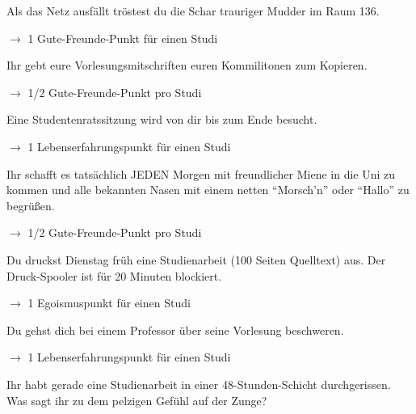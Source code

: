\documentclass[a4paper,12pt]{article}
\begin{document}
    Als das Netz ausf\"allt tr\"ostest du die Schar trauriger
    Mudder im Raum 136.

    $\rightarrow$ 1 Gute-Freunde-Punkt f\"ur einen Studi
    \vspace{10mm}



    Ihr gebt eure Vorlesungsmitschriften euren Kommilitonen
    zum Kopieren.

    $\rightarrow$ 1/2 Gute-Freunde-Punkt pro Studi
    \vspace{10mm}



    Eine Studentenratssitzung wird von dir bis zum Ende besucht.

    $\rightarrow$ 1 Lebenserfahrungspunkt f\"ur einen Studi
    \vspace{10mm}



    Ihr schafft es tats\"achlich JEDEN Morgen mit freundlicher Miene
    in die Uni zu kommen und alle bekannten Nasen mit einem netten
    ``Morsch'n'' oder ``Hallo'' zu begr\"u{\ss}en.

    $\rightarrow$ 1/2 Gute-Freunde-Punkt pro Studi
    \vspace{10mm}



    Du druckst Dienstag fr\"uh eine Studienarbeit (100 Seiten
    Quelltext) aus. Der Druck-Spooler ist f\"ur 20 Minuten blockiert.

    $\rightarrow$ 1 Egoismuspunkt f\"ur einen Studi
    \vspace{10mm}



    Du gehst dich bei einem Professor \"uber seine Vorlesung
    beschweren.

    $\rightarrow$ 1 Lebenserfahrungspunkt f\"ur einen Studi
    \vspace{10mm}



    Ihr habt gerade eine Studienarbeit in einer 48-Stunden-Schicht
    durchgerissen. Was sagt ihr zu dem pelzigen Gef\"uhl auf
    der Zunge?
\end{document}
